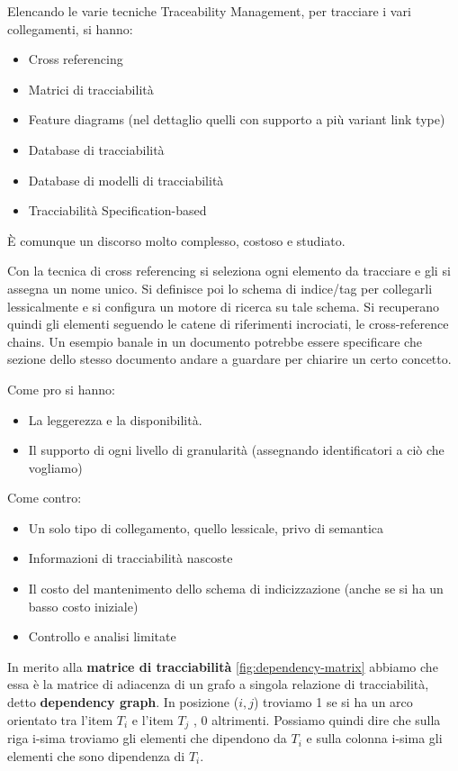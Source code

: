Elencando le varie tecniche Traceability Management, per tracciare i vari
collegamenti, si hanno:
\begin{itemize}
      \item Cross referencing
      \item Matrici di tracciabilità
      \item Feature diagrams (nel dettaglio quelli con supporto a più variant link
            type)
      \item Database di tracciabilità
      \item Database di modelli di tracciabilità
      \item Tracciabilità Specification-based
\end{itemize}
È comunque un discorso molto complesso, costoso e studiato.

Con la tecnica di cross referencing si seleziona ogni elemento da tracciare e
gli si assegna un nome unico. Si definisce poi lo schema di indice/tag per
collegarli lessicalmente e si configura un motore di ricerca su tale schema.
Si recuperano quindi gli elementi seguendo le catene di riferimenti incrociati,
le cross-reference chains. Un esempio banale in un documento potrebbe essere
specificare che sezione dello stesso documento andare a guardare per chiarire un
certo concetto.

Come pro si hanno:
\begin{itemize}
      \item La leggerezza e la disponibilità.
      \item Il supporto di ogni livello di granularità (assegnando identificatori
            a ciò che vogliamo)
\end{itemize}
Come contro:
\begin{itemize}
      \item Un solo tipo di collegamento, quello lessicale, privo di semantica
      \item Informazioni di tracciabilità nascoste
      \item Il costo del mantenimento dello schema di indicizzazione (anche se si ha
            un basso costo iniziale)
      \item Controllo e analisi limitate
\end{itemize}
In merito alla \textbf{matrice di tracciabilità} \ref{fig:dependency-matrix}
abbiamo che essa è la matrice di adiacenza di un grafo a singola relazione di
tracciabilità, detto \textbf{dependency graph}. In posizione ($i,j$) troviamo 1
se si ha un arco orientato tra l'item $T_i$ e l'item $T_j$ , 0 altrimenti.
Possiamo quindi dire che sulla riga i-sima troviamo gli elementi che dipendono
da $T_i$ e sulla colonna i-sima gli elementi che sono dipendenza di $T_i$.

